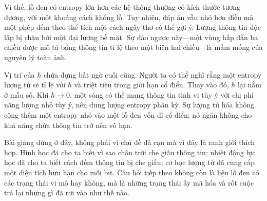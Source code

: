 Vì thế, lỗ đen có entropy lớn hơn các hệ thông thường có kích thước tương đương, với một khoảng cách khổng lồ. Tuy nhiên, đáp án vẫn nhỏ hơn điều mà một phép đếm theo thể tích một cách ngây thơ có thể gợi ý. Lượng thông tin độc lập bị chặn bởi một đại lượng bề mặt. Sự đảo ngược này---một vùng hấp dẫn ba chiều được mô tả bằng thông tin tỉ lệ theo một biên hai chiều---là mầm mống của nguyên lý toàn ảnh.

\begin{classroomqa}
\end{classroomqa}

Vị trí của \(\hbar\) chứa đựng bất ngờ cuối cùng. Người ta có thể nghĩ rằng một entropy lượng tử sẽ tỉ lệ với \(\hbar\) và triệt tiêu trong giới hạn cổ điển. Thay vào đó, \(\hbar\) lại nằm ở mẫu số. Khi \(\hbar\to0\), một sóng có thể mang thông tin tinh vi tùy ý với chi phí năng lượng nhỏ tùy ý, nên dung lượng entropy phân kỳ. Sự lượng tử hóa không cộng thêm một entropy nhỏ vào một lỗ đen vốn dĩ cổ điển; nó ngăn không cho khả năng chứa thông tin trở nên vô hạn.

\begin{classroomqa}
\end{classroomqa}

Bài giảng dừng ở đây, không phải vì chủ đề đã cạn mà vì đây là ranh giới thích hợp. Hình học đã cho ta biết vì sao chân trời che giấu thông tin; nhiệt động lực học đã cho ta biết cách đếm thông tin bị che giấu; cơ học lượng tử đã cung cấp một diện tích hữu hạn cho mỗi bit. Câu hỏi tiếp theo không còn là liệu lỗ đen có các trạng thái vi mô hay không, mà là những trạng thái ấy mã hóa và rốt cuộc trả lại những gì đã rơi vào như thế nào.
